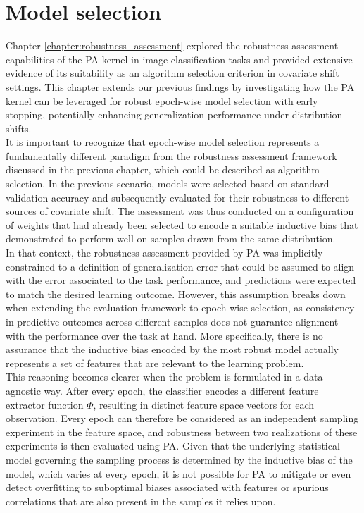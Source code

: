 \chapter{Model selection}\label{chapter:model_selection}

Chapter \ref{chapter:robustness_assessment} explored the robustness assessment
capabilities of the PA kernel in image classification tasks and provided extensive 
evidence of its suitability as an algorithm selection criterion in covariate shift settings. 
This chapter extends our previous findings by investigating 
how the PA kernel can be leveraged for robust epoch-wise model selection
with early stopping, potentially enhancing
generalization performance under distribution shifts. \\

It is important to recognize that epoch-wise model selection represents a fundamentally 
different paradigm from the robustness assessment framework discussed in 
the previous chapter, which could be described as algorithm selection. In 
the previous scenario, models were selected based on standard validation accuracy and subsequently 
evaluated for their robustness to different sources of covariate shift. 
The assessment was thus conducted on a configuration of weights that had already been selected to
encode a suitable inductive bias that demonstrated to perform well on samples drawn
from the same distribution. \\

In that context, the robustness assessment provided by PA was implicitly constrained to a 
definition of generalization error that could be assumed to align with the error associated to
the task performance, and predictions were expected to match the desired learning outcome.
However, this assumption breaks down when extending the evaluation framework to 
epoch-wise selection, as consistency in predictive outcomes across different samples does not 
guarantee alignment with the performance over the task at hand. More specifically,
there is no assurance that the inductive bias encoded by the most robust model actually
represents a set of features that are relevant to the learning problem. \\

This reasoning becomes clearer when the problem is formulated in a data-agnostic way. %
After every epoch, the classifier encodes a different feature extractor function $\Phi$, resulting 
in distinct feature space vectors for each observation. Every epoch can therefore be considered as
an independent sampling experiment in the feature space, and robustness between 
two realizations of these experiments is then evaluated using PA. Given that the 
underlying statistical model governing the sampling process is determined by the inductive 
bias of the model, which varies at every epoch, it is not possible for PA to mitigate or even detect
overfitting to suboptimal biases associated with features or spurious correlations that are also
present in the samples it relies upon. \\


